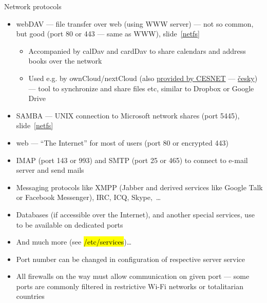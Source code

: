 \documentclass[compress, ucs, xelatex, 11pt, xcolor=svgnames, aspectratio=169,
	hyperref={
		bookmarks=true,
		unicode=true,
		colorlinks=true,
		pdftitle={Linux, command line and MetaCentrum},
		plainpages=false,
		pdfauthor={Vojtech Zeisek},
		pdfsubject={Course about use of Linux command line, writing shell scripts and using MetaCentrum of CESNET},
		pdfcreator={XeLaTeX},
		pdfkeywords={Linux, GNU, BASH, shell, command line, MetaCentrum},
		linkcolor=DarkRed, %
		anchorcolor=DarkBlue, %
		citecolor=Indigo, %
		filecolor=NavyBlue, %
		menucolor=DarkMagenta, %
		urlcolor=DarkBlue, %
		pdftex},
	url={hyphens, lowtilde} %
	]{beamer}
\renewcommand{\texttt}[1]{\hl{\ttfamily #1}}
\begin{document}
\begin{frame}[allowframebreaks]{Network protocols}
\begin{itemize}
		\item webDAV --- file transfer over web (using WWW server) --- not so common, but good (port 80 or 443 --- same as WWW), slide~\ref{netfs}
		\begin{itemize}
			\item Accompanied by calDav and cardDav to share calendars and address books over the network
			\item Used e.g. by ownCloud/nextCloud (also \href{https://du.cesnet.cz/en/navody/owncloud/start}{provided by CESNET} --- \href{https://du.cesnet.cz/cs/navody/owncloud/start}{česky}) --- tool to synchronize and share files etc, similar to Dropbox or Google Drive
		\end{itemize}
		\item SAMBA --- UNIX connection to Microsoft network shares (port 5445), slide~\ref{netfs}
		\item web --- \enquote{The Internet} for most of users (port 80 or encrypted 443)
		\item IMAP (port 143 or 993) and SMTP (port 25 or 465) to connect to e-mail server and send mails
		\item Messaging protocols like XMPP (Jabber and derived services like Google Talk or Facebook Messenger), IRC, ICQ, Skype,~\ldots
		\item Databases (if accessible over the Internet), and another special services, use to be available on dedicated ports
		\item And much more (see \texttt{/etc/services})\ldots
		\item Port number can be changed in configuration of respective server service
		\item All firewalls on the way must allow communication on given port --- some ports are commonly filtered in restrictive Wi-Fi networks or totalitarian countries
	\end{itemize}
\end{frame}
\end{document}
